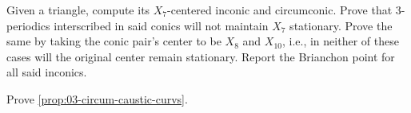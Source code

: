 \begin{question}
Given a triangle, compute its $X_7$-centered inconic and circumconic. Prove that 3-periodics interscribed in said conics will not maintain $X_7$ stationary. Prove the same by taking the conic pair's center to be $X_8$ and $X_{10}$, i.e., in neither of these cases will the original center remain stationary. Report the Brianchon point for all said inconics.
\label{que:03-x7}
\end{question}


\begin{question}
Prove \cref{prop:03-circum-caustic-curvs}.
\label{que:03-circum-caustic-curvs}
\end{question}
